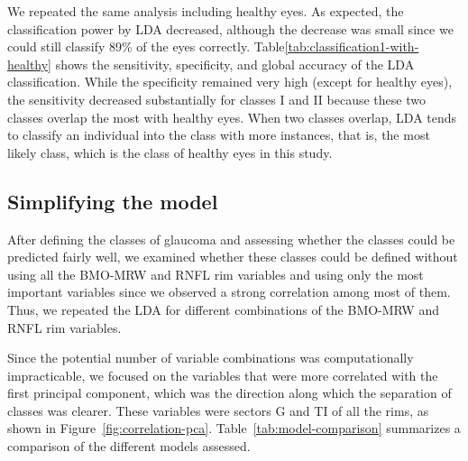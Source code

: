 \documentclass[fleqn,10pt]{wlscirep}
\begin{document}
We repeated the same analysis including healthy eyes. As expected, the classification power by LDA decreased, although the decrease was small since we could still classify 89\% of the eyes correctly. Table\ref{tab:classification1-with-healthy} shows the sensitivity, specificity, and global accuracy of the LDA classification. While the specificity remained very high (except for healthy eyes), the sensitivity decreased substantially for classes I and II because these two classes overlap the most with healthy eyes. When two classes overlap, LDA tends to classify an individual into the class with more instances, that is, the most likely class, which is the class of healthy eyes in this study.

\subsection*{Simplifying the model}

After defining the classes of glaucoma and assessing whether the classes could be predicted fairly well, we examined whether these classes could be defined without using all the BMO-MRW and RNFL rim variables and using only the most important variables since we observed a strong correlation among most of them. Thus, we repeated the LDA for different combinations of the BMO-MRW and RNFL rim variables. 

Since the potential number of variable combinations was computationally impracticable, we focused on the variables that were more correlated with the first principal component, which was the direction along which the separation of classes was clearer. These variables were sectors G and TI of all the rims, as shown in Figure~\ref{fig:correlation-pca}. Table~\ref{tab:model-comparison} summarizes a comparison of the different models assessed. 
\end{document}

